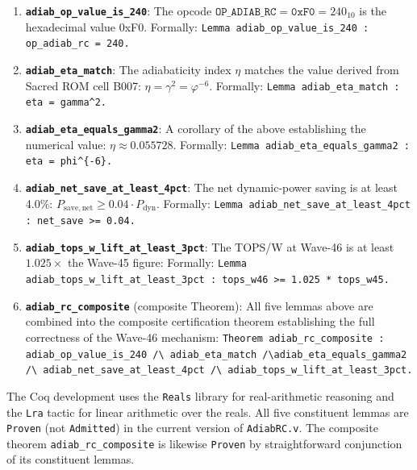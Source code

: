 \begin{enumerate}
  \item \textbf{\texttt{adiab\_op\_value\_is\_240}}: The opcode
        $\texttt{OP\_ADIAB\_RC} = \texttt{0xF0} = 240_{10}$ is the
        hexadecimal value 0xF0.
        Formally: \texttt{Lemma adiab\_op\_value\_is\_240 : op\_adiab\_rc = 240.}

  \item \textbf{\texttt{adiab\_eta\_match}}: The adiabaticity index $\eta$
        matches the value derived from Sacred ROM cell B007:
        $\eta = \gamma^{2} = \varphi^{-6}$.
        Formally: \texttt{Lemma adiab\_eta\_match : eta = gamma\^{}2.}

  \item \textbf{\texttt{adiab\_eta\_equals\_gamma2}}: A corollary of the
        above establishing the numerical value:
        $\eta \approx 0.055728$.
        Formally: \texttt{Lemma adiab\_eta\_equals\_gamma2 : eta = phi\^{}\{-6\}.}

  \item \textbf{\texttt{adiab\_net\_save\_at\_least\_4pct}}: The net dynamic-power
        saving is at least 4.0\%:
        $P_{\mathrm{save,net}} \geq 0.04 \cdot P_{\mathrm{dyn}}$.
        Formally: \texttt{Lemma adiab\_net\_save\_at\_least\_4pct : net\_save >= 0.04.}

  \item \textbf{\texttt{adiab\_tops\_w\_lift\_at\_least\_3pct}}: The TOPS/W
        at Wave-46 is at least $1.025 \times$ the Wave-45 figure:
        Formally: \texttt{Lemma adiab\_tops\_w\_lift\_at\_least\_3pct : tops\_w46 >= 1.025 * tops\_w45.}

  \item \textbf{\texttt{adiab\_rc\_composite}} (composite Theorem): All
        five lemmas above are combined into the composite certification
        theorem establishing the full correctness of the Wave-46 mechanism:
        \texttt{Theorem adiab\_rc\_composite : adiab\_op\_value\_is\_240 /\textbackslash
        adiab\_eta\_match /\textbackslash adiab\_eta\_equals\_gamma2 /\textbackslash
        adiab\_net\_save\_at\_least\_4pct /\textbackslash
        adiab\_tops\_w\_lift\_at\_least\_3pct.}
\end{enumerate}

The Coq development uses the \texttt{Reals} library for real-arithmetic
reasoning and the \texttt{Lra} tactic for linear arithmetic over the reals.
All five constituent lemmas are \texttt{Proven} (not \texttt{Admitted}) in the
current version of \texttt{AdiabRC.v}.
The composite theorem \texttt{adiab\_rc\_composite} is likewise \texttt{Proven}
by straightforward conjunction of its constituent lemmas.

